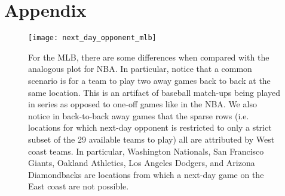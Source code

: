 \documentclass[letterpaper,12pt]{article}
\begin{document}
\section{Appendix}
\begin{figure}[h]
  \centering
  \hspace{-55pt}
  \label{fig: next day opponent mlb}
  \texttt{[image: next\_day\_opponent\_mlb]} 
  \caption{For the MLB, there are some differences when compared with the     analogous
  plot for NBA. In particular, notice that a common scenario is for a team to play two away games 
  back to back at the same location. This is an artifact of baseball match-ups being played 
  in series as opposed to one-off games like in the NBA. We also notice in back-to-back
  away games that the sparse rows 
  (i.e. locations for which next-day opponent is restricted to only a strict subset of the 
  29 available teams to play) all are attributed by West coast teams. In particular, 
  Washington Nationals, San Francisco Giants, Oakland Athletics, Los Angeles Dodgers, and 
  Arizona Diamondbacks are locations from which a next-day game on the East coast are not possible.}
\end{figure}
\end{document}
